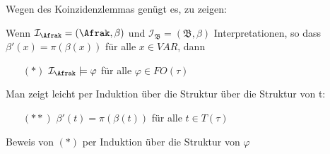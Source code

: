 Wegen des Koinzidenzlemmas genügt es, zu zeigen:

Wenn $\mathcal{I}_\Afrak = (\Afrak,\beta)$ und $\mathcal{I}_\mathfrak{B} = (\mathfrak{B}, \beta)$ Interpretationen,
so dass $\beta'(x) = \pi(\beta(x))$ für alle $x\in VAR$, dann

\begin{itemize}
  \item[$(*)$] $\mathcal{I}_\Afrak \models \varphi$ für alle $\varphi \in FO(\tau)$
\end{itemize}

Man zeigt leicht per Induktion über die Struktur über die Struktur von t:

\begin{itemize}
  \item[$(**)$] $\beta'(t) = \pi(\beta(t))$ für alle $t \in T(\tau)$
\end{itemize}

Beweis von $(*)$ per Induktion über die Struktur von $\varphi$


